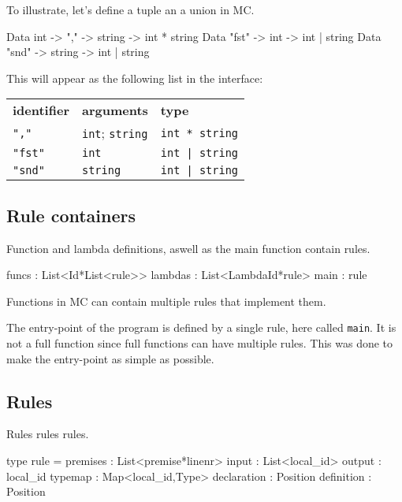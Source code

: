 To illustrate, let's define a tuple an a union in MC.

\begin{code}
Data int -> "," -> string -> int * string
Data "fst" -> int    -> int | string
Data "snd" -> string -> int | string
\end{code}

This will appear as the following list in the interface:

\begin{tabular}{lll}
    \textbf{identifier} & \textbf{arguments} & \textbf{type}\\
    \verb:",":   & \verb:int:; \verb:string: & \verb:int * string: \\
    \verb:"fst": & \verb:int:                & \verb:int | string: \\
    \verb:"snd": & \verb:string:             & \verb:int | string: \\
\end{tabular}


\subsection{Rule containers}

Function and lambda definitions, aswell as the main function contain rules.

\begin{code}
  funcs   : List<Id*List<rule>>
  lambdas : List<LambdaId*rule>
  main    : rule
\end{code}

Functions in MC can contain multiple rules that implement them.

The entry-point of the program is defined by a single rule, here called \verb|main|.
It is not a full function since full functions can have multiple rules.
This was done to make the entry-point as simple as possible.

\subsection{Rules}

Rules rules rules.

\begin{code}
type rule = {
  premises    : List<premise*linenr>
  input       : List<local_id>
  output      : local_id
  typemap     : Map<local_id,Type>
  declaration : Position
  definition  : Position
}
\end{code}

